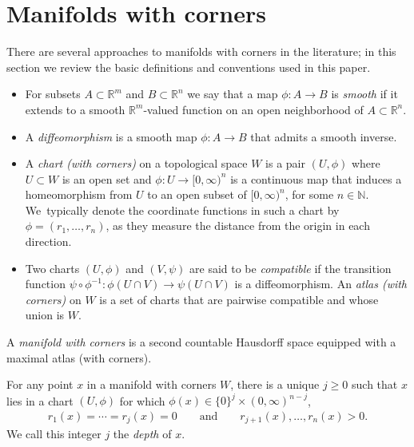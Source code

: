 \documentclass[JEP,XML,SOM,Unicode,NoFloatCountersInSection,published]{cedram}
\theoremstyle{definition}
\theoremstyle{remark}
\let\defn\emph
\newcommand{\RR}{\mathbb{R}}
\newcommand{\NN}{\mathbb{N}}
\newcommand{\halfspc}[1]{[0,\infty)^{#1}}
\renewcommand{\ge}{\geqslant}
\begin{document}
\section{Manifolds with corners}
There are several approaches to manifolds with corners in the literature; in this section we review the basic definitions and conventions used in this paper.


\begin{itemize}
\item
For subsets $A\subset \RR^m$ and $B\subset \RR^n$ we say that a map $\phi\colon A\to B$ is \defn{smooth} if it extends to a smooth $\RR^m$-valued function on an open neighborhood of $A\subset \RR^n$.

\item
A \defn{diffeomorphism} is a smooth map $\phi\colon A\to B$ that admits a smooth inverse.

\item
A \defn{chart (with corners)} on a topological space $W$ is a pair $(U,\phi)$ where $U\subset W$ is an open set and $\phi\colon U\to \halfspc{n}$ is a continuous map that induces a homeomorphism from $U$ to an open subset of $\halfspc{n}$, for some $n\in\NN$. We~typically denote the coordinate functions in such a chart by $\phi=(r_1,\ldots,r_n)$, as they measure the distance from the origin in each direction.

\item
Two charts $(U,\phi)$ and $(V,\psi)$ are said to be \defn{compatible} if the transition function $\psi\circ \phi^{-1}\colon \phi(U\cap V)\to \psi(U\cap V)$ is a diffeomorphism. An \defn{atlas (with corners)} on $W$ is a set of charts that are pairwise compatible and whose union is $W$.
\end{itemize}

\begin{definition}\label{def:mfld-with-corners}
A \defn{manifold with corners} is a second countable Hausdorff space equipped with a maximal atlas (with corners).
\end{definition}
For any point $x$ in a manifold with corners $W$, there is a unique $j \ge0$ such that $x$ lies in a chart $(U,\phi)$ for which $\phi(x) \in \{0\}^j \times (0,\infty)^{n-j}$, \ie
\begin{align}
r_1(x)=\cdots=r_j(x)=0 \qquad \textrm{and} \qquad r_{j+1}(x),\ldots,r_n(x) > 0. \label{eq:good-coords}
\end{align}
We call this integer $j$ the \defn{depth} of $x$.
\end{document}
